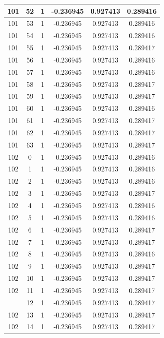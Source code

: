\documentclass[12pt,a4paper]{article}
\numberwithin{equation}{section}
\numberwithin{figure}{section}
\numberwithin{table}{section}
\begin{document}
\begin{longtable}{|c|c|c|c|c|c|}
101 & 52 & 1 & -0.236945 & 0.927413 & 0.289416 \\ \hline
101 & 53 & 1 & -0.236945 & 0.927413 & 0.289416 \\ \hline
101 & 54 & 1 & -0.236945 & 0.927413 & 0.289416 \\ \hline
101 & 55 & 1 & -0.236945 & 0.927413 & 0.289417 \\ \hline
101 & 56 & 1 & -0.236945 & 0.927413 & 0.289416 \\ \hline
101 & 57 & 1 & -0.236945 & 0.927413 & 0.289416 \\ \hline
101 & 58 & 1 & -0.236945 & 0.927413 & 0.289417 \\ \hline
101 & 59 & 1 & -0.236945 & 0.927413 & 0.289417 \\ \hline
101 & 60 & 1 & -0.236945 & 0.927413 & 0.289416 \\ \hline
101 & 61 & 1 & -0.236945 & 0.927413 & 0.289417 \\ \hline
101 & 62 & 1 & -0.236945 & 0.927413 & 0.289417 \\ \hline
101 & 63 & 1 & -0.236945 & 0.927413 & 0.289417 \\ \hline
102 & 0 & 1 & -0.236945 & 0.927413 & 0.289416 \\ \hline
102 & 1 & 1 & -0.236945 & 0.927413 & 0.289416 \\ \hline
102 & 2 & 1 & -0.236945 & 0.927413 & 0.289416 \\ \hline
102 & 3 & 1 & -0.236945 & 0.927413 & 0.289417 \\ \hline
102 & 4 & 1 & -0.236945 & 0.927413 & 0.289416 \\ \hline
102 & 5 & 1 & -0.236945 & 0.927413 & 0.289416 \\ \hline
102 & 6 & 1 & -0.236945 & 0.927413 & 0.289417 \\ \hline
102 & 7 & 1 & -0.236945 & 0.927413 & 0.289417 \\ \hline
102 & 8 & 1 & -0.236945 & 0.927413 & 0.289416 \\ \hline
102 & 9 & 1 & -0.236945 & 0.927413 & 0.289417 \\ \hline
102 & 10 & 1 & -0.236945 & 0.927413 & 0.289417 \\ \hline
102 & 11 & 1 & -0.236945 & 0.927413 & 0.289417 \\ \hline
\pagebreak
102 & 12 & 1 & -0.236945 & 0.927413 & 0.289417 \\ \hline
102 & 13 & 1 & -0.236945 & 0.927413 & 0.289417 \\ \hline
102 & 14 & 1 & -0.236945 & 0.927413 & 0.289417 \\ \hline

\end{longtable}
\end{document}
